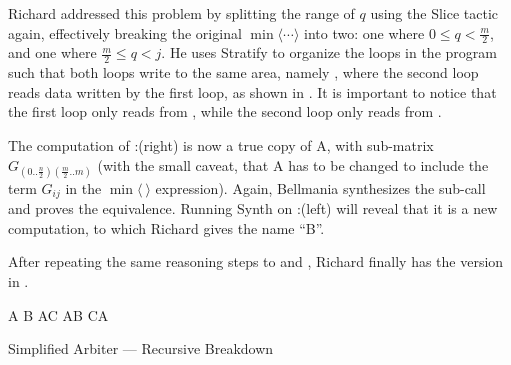 Richard addressed this problem by splitting the range of $q$ using the {\sf Slice}
tactic again, effectively breaking the original $\min\langle\cdots\rangle$ into two:
one where $0\leq q < \frac{m}{2}$,
and one where $\frac{m}{2}\leq q < j$. 
He uses {\sf Stratify} to organize the loops in the program such that both 
loops write to the same area, namely , where the second loop reads data
written by the first loop, as shown in .
It is important to notice that the first loop only reads from , 
while the second loop only reads from .

The computation of :(right) is now a true copy of A,
with sub-matrix $G_{(0..\frac{n}{2})(\frac{m}{2}..m)}$ (with the small caveat,
that A has to be changed to include the term $G_{ij}$ in the $\min\langle~\rangle$ expression).
Again, Bellmania synthesizes the sub-call and proves the equivalence.
Running {\sf Synth} on :(left) will reveal that it is a new computation,
to which Richard gives the name ``B''. 

After repeating
the same reasoning steps to  and ,
Richard finally has the version in .

\begin{algorithm}
\renewcommand\arraystretch{1.3}
\begin{algorithmic}
  \State A 
  \State B    
  \State A
  \State C    
  \State A
  \State B    
  \State C
  \State A
\EndProcedure
\end{algorithmic}
\caption{\label{intro:recursive-A}
   Simplified Arbiter --- Recursive Breakdown}
\end{algorithm}


